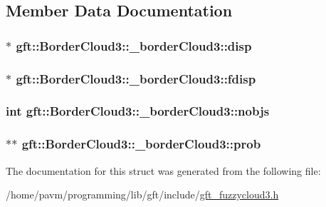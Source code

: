 \subsection{Member Data Documentation}
\hypertarget{structgft_1_1BorderCloud3_1_1__borderCloud3_a0fec3cf9d771fd02fcbb1687a51cc937}{
\subsubsection[{disp}]{$\ast$ gft\-::\-Border\-Cloud3\-::\-\_\-border\-Cloud3\-::disp}}\label{structgft_1_1BorderCloud3_1_1__borderCloud3_a0fec3cf9d771fd02fcbb1687a51cc937}
\hypertarget{structgft_1_1BorderCloud3_1_1__borderCloud3_aa24ef7cdb7021c700f0148d2d137a753}{
\subsubsection[{fdisp}]{$\ast$ gft\-::\-Border\-Cloud3\-::\-\_\-border\-Cloud3\-::fdisp}}\label{structgft_1_1BorderCloud3_1_1__borderCloud3_aa24ef7cdb7021c700f0148d2d137a753}
\hypertarget{structgft_1_1BorderCloud3_1_1__borderCloud3_a9837901f9e28f40dd2918d9687e53582}{
\subsubsection[{nobjs}]{\setlength{\rightskip}{0pt plus 5cm}int gft\-::\-Border\-Cloud3\-::\-\_\-border\-Cloud3\-::nobjs}}\label{structgft_1_1BorderCloud3_1_1__borderCloud3_a9837901f9e28f40dd2918d9687e53582}
\hypertarget{structgft_1_1BorderCloud3_1_1__borderCloud3_a3828cfea35d3619a113a52594662993d}{
\subsubsection[{prob}]{$\ast$$\ast$ gft\-::\-Border\-Cloud3\-::\-\_\-border\-Cloud3\-::prob}}\label{structgft_1_1BorderCloud3_1_1__borderCloud3_a3828cfea35d3619a113a52594662993d}


The documentation for this struct was generated from the following file\-:\begin{DoxyCompactItemize}
\item 
/home/pavm/programming/lib/gft/include/\hyperlink{gft__fuzzycloud3_8h}{gft\-\_\-fuzzycloud3.\-h}\end{DoxyCompactItemize}
